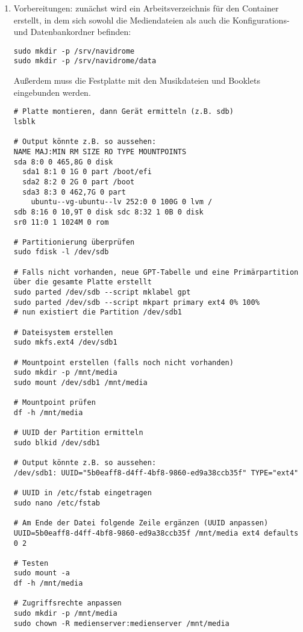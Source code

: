 \documentclass[12pt,a4paper]{report}
\begin{document}
  \begin{enumerate}
    \item Vorbereitungen:
    zunächst wird ein Arbeitsverzeichnis für den Container erstellt, in dem sich sowohl die Mediendateien als auch die Konfigurations- und Datenbankordner befinden:

    \begin{verbatim}
sudo mkdir -p /srv/navidrome
sudo mkdir -p /srv/navidrome/data
    \end{verbatim}

    Außerdem muss die Festplatte mit den Musikdateien und Booklets eingebunden werden.
    
    \begin{verbatim}
# Platte montieren, dann Gerät ermitteln (z.B. sdb)
lsblk

# Output könnte z.B. so aussehen:
NAME MAJ:MIN RM SIZE RO TYPE MOUNTPOINTS 
sda 8:0 0 465,8G 0 disk 
  sda1 8:1 0 1G 0 part /boot/efi 
  sda2 8:2 0 2G 0 part /boot 
  sda3 8:3 0 462,7G 0 part 
    ubuntu--vg-ubuntu--lv 252:0 0 100G 0 lvm / 
sdb 8:16 0 10,9T 0 disk sdc 8:32 1 0B 0 disk 
sr0 11:0 1 1024M 0 rom

# Partitionierung überprüfen
sudo fdisk -l /dev/sdb

# Falls nicht vorhanden, neue GPT-Tabelle und eine Primärpartition über die gesamte Platte erstellt
sudo parted /dev/sdb --script mklabel gpt
sudo parted /dev/sdb --script mkpart primary ext4 0% 100%
# nun existiert die Partition /dev/sdb1

# Dateisystem erstellen
sudo mkfs.ext4 /dev/sdb1

# Mountpoint erstellen (falls noch nicht vorhanden)
sudo mkdir -p /mnt/media
sudo mount /dev/sdb1 /mnt/media

# Mountpoint prüfen
df -h /mnt/media

# UUID der Partition ermitteln
sudo blkid /dev/sdb1

# Output könnte z.B. so aussehen:
/dev/sdb1: UUID="5b0eaff8-d4ff-4bf8-9860-ed9a38ccb35f" TYPE="ext4"

# UUID in /etc/fstab eingetragen
sudo nano /etc/fstab

# Am Ende der Datei folgende Zeile ergänzen (UUID anpassen)
UUID=5b0eaff8-d4ff-4bf8-9860-ed9a38ccb35f /mnt/media ext4 defaults 0 2 

# Testen
sudo mount -a
df -h /mnt/media

# Zugriffsrechte anpassen
sudo mkdir -p /mnt/media
sudo chown -R medienserver:medienserver /mnt/media


\end{verbatim}
\end{enumerate}
\end{document}
